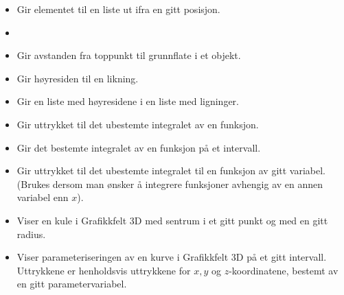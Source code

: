 \begin{itemize}
	
	\item {}
	{
		Gir elementet til en liste ut ifra en gitt posisjon.
	}
	
	\item {}
	

	\item {}
	{Gir avstanden fra toppunkt til grunnflate i et objekt.\\ 
		}
	
	\item {}
	{Gir høyresiden til en likning.}
	
	\item {}
	{Gir en liste med høyresidene i en liste med ligninger.}
	
	\item {}
	{Gir uttrykket til det ubestemte integralet av en funksjon. \\
	}
	
	\item {}
	{Gir det bestemte integralet av en funksjon på et intervall.}
	
	\item {}
	{Gir uttrykket til det ubestemte integralet til en funksjon av gitt variabel. (Brukes dersom man ønsker å integrere funksjoner avhengig av en annen variabel enn $ x $).}
	
	\item {}
	{Viser en kule i Grafikkfelt 3D med sentrum i et gitt punkt og med en gitt radius.}
	
	\item {}
	{Viser parameteriseringen av en kurve i Grafikkfelt 3D på et gitt intervall. Uttrykkene er henholdsvis uttrykkene for $ {x, y} $ og $ z $-koordinatene, bestemt av en gitt parametervariabel. \\
		}	
	

\end{itemize}
